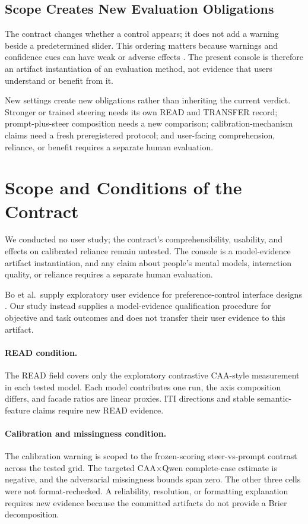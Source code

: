 \documentclass[sigconf]{acmart}
\begin{document}
\subsection{Scope Creates New Evaluation Obligations}

The contract changes whether a control appears; it does not add a warning beside a predetermined slider. This ordering matters because warnings and confidence cues can have weak or adverse effects \cite{bansal2019beyond,bucinca2021trust}. The present console is therefore an artifact instantiation of an evaluation method, not evidence that users understand or benefit from it.

New settings create new obligations rather than inheriting the current verdict. Stronger or trained steering needs its own READ and TRANSFER record; prompt-plus-steer composition needs a new comparison; calibration-mechanism claims need a fresh preregistered protocol; and user-facing comprehension, reliance, or benefit requires a separate human evaluation.

\section{Scope and Conditions of the Contract}
\label{sec:limitations}

We conducted no user study; the contract's comprehensibility, usability, and effects on calibrated reliance remain untested. The console is a model-evidence artifact instantiation, and any claim about people's mental models, interaction quality, or reliance requires a separate human evaluation.

Bo et al.\ supply exploratory user evidence for preference-control interface designs \cite{bo2026steerable}. Our study instead supplies a model-evidence qualification procedure for objective and task outcomes and does not transfer their user evidence to this artifact.

\paragraph{READ condition.}
The READ field covers only the exploratory contrastive CAA-style measurement in each tested model. Each model contributes one run, the axis composition differs, and facade ratios are linear proxies. ITI directions and stable semantic-feature claims require new READ evidence.

\paragraph{Calibration and missingness condition.}
The calibration warning is scoped to the frozen-scoring steer-vs-prompt contrast across the tested grid. The targeted CAA$\times$Qwen complete-case estimate is negative, and the adversarial missingness bounds span zero. The other three cells were not format-rechecked. A reliability, resolution, or formatting explanation requires new evidence because the committed artifacts do not provide a Brier decomposition.
\end{document}
